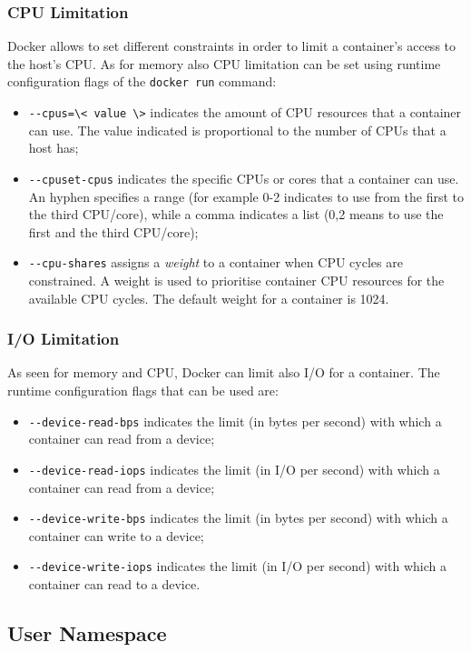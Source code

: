 \documentclass[a4paper,12pt]{article}
\newcommand{\code}[1]{\lstinline|#1|}
\begin{document}
\subsubsection{CPU Limitation} 

Docker allows to set different constraints in order to limit a container's
access to the host's CPU. As for memory also CPU limitation can be set using
runtime configuration flags of the \code{docker run} command:
\begin{itemize}
  \item \code{--cpus=\< value \>} indicates the amount of CPU
  resources that a container can use. The value indicated is proportional to the
  number of CPUs that a host has;
  \item \code{--cpuset-cpus} indicates the specific CPUs or cores that a
  container can use. An hyphen specifies a range (for example 0-2 indicates to
  use from the first to the third CPU/core), while a comma indicates a list
  (0,2 means to use the first and the third CPU/core);
  \item \code{--cpu-shares} assigns a \textit{weight} to a container  when CPU
  cycles are constrained. A weight is used to prioritise container CPU resources
  for the available CPU cycles. The default weight for a container is 1024.
\end{itemize}

\subsubsection{I/O Limitation}

As seen for memory and CPU, Docker can limit also I/O for a container. The
runtime configuration flags that can be used are: 
\begin{itemize}
  \item \code{--device-read-bps} indicates the limit (in bytes per second)
  with which a container can read from a device;
  \item \code{--device-read-iops} indicates the limit (in I/O per second)
  with which a container can read from a device;
  \item \code{--device-write-bps} indicates the limit (in bytes per second)
  with which a container can write to a device;
  \item \code{--device-write-iops} indicates the limit (in I/O per second)
  with which a container can read to a device.
\end{itemize}

\subsection{User Namespace}
\end{document}
